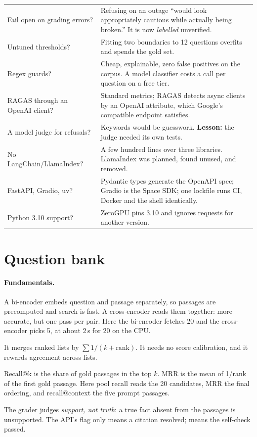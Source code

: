 \begin{center}
\begin{tabularx}{\textwidth}{@{}>{\raggedright\arraybackslash}p{4.3cm}L@{}}
Fail open on grading errors? & Refusing on an outage ``would look appropriately cautious while actually being broken.'' It is now \emph{labelled} unverified.\\
Untuned thresholds? & Fitting two boundaries to 12 questions overfits and spends the gold set.\\
Regex guards? & Cheap, explainable, zero false positives on the corpus. \tagI{} A model classifier costs a call per question on a free tier.\\
RAGAS through an OpenAI client? & Standard metrics; RAGAS detects async clients by an OpenAI attribute, which Google's compatible endpoint satisfies.\\
A model judge for refusals? & Keywords would be guesswork. \textbf{Lesson:} the judge needed its own tests.\\
No LangChain/LlamaIndex? & A few hundred lines over three libraries. LlamaIndex was planned, found unused, and removed.\\
FastAPI, Gradio, uv? & Pydantic types generate the OpenAPI spec; Gradio is the Space SDK; one lockfile runs CI, Docker and the shell identically.\\
Python 3.10 support? & ZeroGPU pins 3.10 and ignores requests for another version.\\
\bottomrule
\end{tabularx}
\end{center}

\section{Question bank}

\paragraph{Fundamentals.}
\begin{description}[style=nextline,itemsep=1pt]
  \item[Bi-encoder vs cross-encoder?] A bi-encoder embeds question and passage separately, so passages are precomputed and search is fast. A cross-encoder reads them together: more accurate, but one pass per pair. Here the bi-encoder fetches 20 and the cross-encoder picks 5, at about 2\,s for 20 on the CPU.
  \item[What's RRF?] It merges ranked lists by $\sum 1/(k+\text{rank})$. It needs no score calibration, and it rewards agreement across lists.
  \item[Recall@k vs MRR?] Recall@k is the share of gold passages in the top $k$. MRR is the mean of 1/rank of the first gold passage. Here pool recall reads the 20 candidates, MRR the final ordering, and recall@context the five prompt passages.
  \item[What does ``grounded'' mean?] The grader judges \emph{support, not truth}: a true fact absent from the passages is unsupported. The API's  flag only means a citation resolved;  means the self-check passed.
\end{description}


